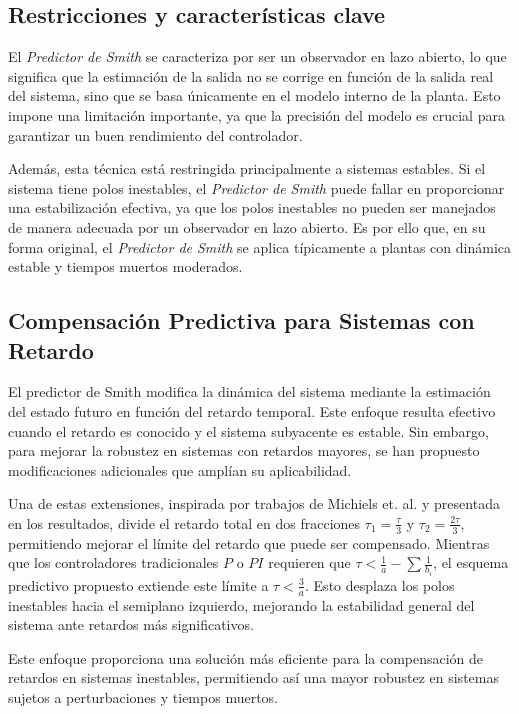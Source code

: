 \documentclass[conference]{IEEEtran}
\begin{document}
\subsection{Restricciones y características clave}

El \textit{Predictor de Smith} se caracteriza por ser un observador en lazo abierto, lo que significa que la estimación de la salida no se corrige en función de la salida real del sistema, sino que se basa únicamente en el modelo interno de la planta. Esto impone una limitación importante, ya que la precisión del modelo es crucial para garantizar un buen rendimiento del controlador.

Además, esta técnica está restringida principalmente a sistemas estables. Si el sistema tiene polos inestables, el \textit{Predictor de Smith} puede fallar en proporcionar una estabilización efectiva, ya que los polos inestables no pueden ser manejados de manera adecuada por un observador en lazo abierto. Es por ello que, en su forma original, el \textit{Predictor de Smith} se aplica típicamente a plantas con dinámica estable y tiempos muertos moderados.

\subsection{Compensación Predictiva para Sistemas con Retardo}

El predictor de Smith modifica la dinámica del sistema mediante la estimación del estado futuro en función del retardo temporal. Este enfoque resulta efectivo cuando el retardo es conocido y el sistema subyacente es estable. Sin embargo, para mejorar la robustez en sistemas con retardos mayores, se han propuesto modificaciones adicionales que amplían su aplicabilidad.

Una de estas extensiones, inspirada por trabajos de Michiels et. al.\cite{michiels2002continuous} y presentada en los resultados, divide el retardo total en dos fracciones \(\tau_1 = \frac{\tau}{3}\) y \(\tau_2 = \frac{2\tau}{3}\), permitiendo mejorar el límite del retardo que puede ser compensado. Mientras que los controladores tradicionales \(P\) o \(PI\) requieren que \(\tau < \frac{1}{a} - \sum\frac{1}{b_i}\), el esquema predictivo propuesto extiende este límite a \(\tau < \frac{3}{a}\). Esto desplaza los polos inestables hacia el semiplano izquierdo, mejorando la estabilidad general del sistema ante retardos más significativos.

Este enfoque proporciona una solución más eficiente para la compensación de retardos en sistemas inestables, permitiendo así una mayor robustez en sistemas sujetos a perturbaciones y tiempos muertos.
\end{document}
